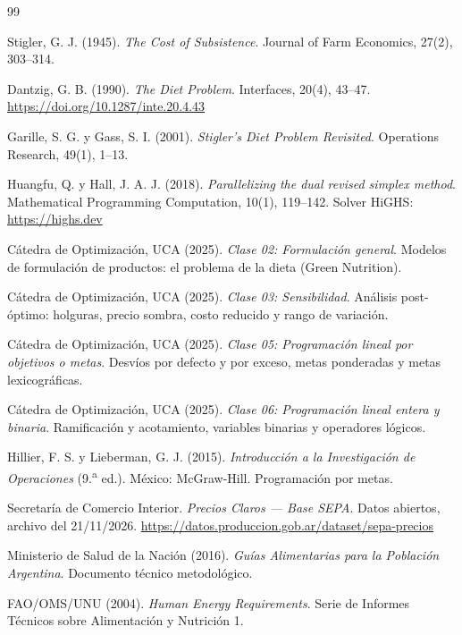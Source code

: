 \documentclass[10pt,a4paper]{article}
\begin{document}
\begin{thebibliography}{99}

 Stigler, G. J. (1945). \emph{The Cost of Subsistence}. Journal of
  Farm Economics, 27(2), 303--314.

 Dantzig, G. B. (1990). \emph{The Diet Problem}. Interfaces, 20(4),
  43--47. \url{https://doi.org/10.1287/inte.20.4.43}

 Garille, S. G. y Gass, S. I. (2001). \emph{Stigler's Diet Problem
  Revisited}. Operations Research, 49(1), 1--13.

 Huangfu, Q. y Hall, J. A. J. (2018). \emph{Parallelizing the dual
  revised simplex method}. Mathematical Programming Computation, 10(1), 119--142.
  Solver HiGHS: \url{https://highs.dev}

 Cátedra de Optimización, UCA (2025). \emph{Clase 02:
  Formulación general}. Modelos de formulación de productos: el problema de la dieta
  (Green Nutrition).

 Cátedra de Optimización, UCA (2025). \emph{Clase 03:
  Sensibilidad}. Análisis post-óptimo: holguras, precio sombra, costo reducido y
  rango de variación.

 Cátedra de Optimización, UCA (2025). \emph{Clase 05:
  Programación lineal por objetivos o metas}. Desvíos por defecto y por exceso,
  metas ponderadas y metas lexicográficas.

 Cátedra de Optimización, UCA (2025). \emph{Clase 06:
  Programación lineal entera y binaria}. Ramificación y acotamiento, variables
  binarias y operadores lógicos.

 Hillier, F. S. y Lieberman, G. J. (2015). \emph{Introducción a la
  Investigación de Operaciones} (9.\textsuperscript{a} ed.). México: McGraw-Hill.
  Programación por metas.

 Secretaría de Comercio Interior. \emph{Precios Claros — Base SEPA}.
  Datos abiertos, archivo del 21/11/2026.
  \url{https://datos.produccion.gob.ar/dataset/sepa-precios}

 Ministerio de Salud de la Nación (2016). \emph{Guías Alimentarias para
  la Población Argentina}. Documento técnico metodológico.

 FAO/OMS/UNU (2004). \emph{Human Energy Requirements}. Serie de Informes
  Técnicos sobre Alimentación y Nutrición 1.


\end{thebibliography}
\end{document}
